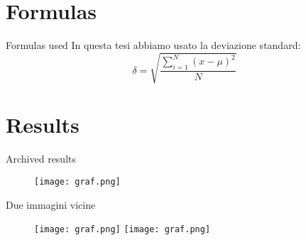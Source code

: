 \documentclass{beamer} %
\begin{document}

\section{Formulas}
\begin{frame}{Formulas used}
In questa tesi abbiamo usato la deviazione standard:
\bigskip %
    \begin{equation} %
        \delta = \sqrt{\frac{\displaystyle\sum_{i=1}^N (x - \mu)^2}{N}} %
    \end{equation}
\end{frame}

\section{Results}

\begin{frame}{Archived results} %
    \begin{figure}
        \centering
        \texttt{[image: graf.png]}  %
    \end{figure}
\end{frame}

\begin{frame}{Due immagini vicine} 
    \begin{figure}
        \centering
        \texttt{[image: graf.png]} 
        \pause \texttt{[image: graf.png]} %
    \end{figure}
\end{frame}
\end{document}
